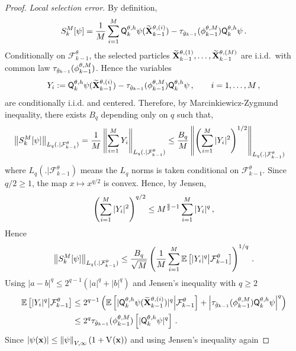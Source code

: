 \documentclass[11pt]{article}
\theoremstyle{plain}
\theoremstyle{definition}
\theoremstyle{remark}
\begin{document}
\begin{proof}
\noindent\emph{Local selection error.} By definition,
        $$
        \selerr{k}[\psi]
        = \frac1M \sum_{i=1}^M \mk{k}[\theta,h] \psi (\widetilde \X^{\theta,(i)}_{k-1}) - \tau_{\approxpot{k-1}}(\mcfilter{k-1}) \mk{k}[\theta,h]{\psi} \eqsp.
        $$
        Conditionally on $\mathcal F^\theta_{k-1}$, the selected particles $ \widetilde {\mathbf{X}}^{\theta,(1)}_{k-1},\ldots,\widetilde {\mathbf{X}}^{\theta ,(M)}_{k-1} $
        are i.i.d.\ with common law $\tau_{\approxpot{k-1}}(\mcfilter{k-1})$. Hence the variables
        $$
        Y_i
        \eqdef \mk{k}[\theta,h]\psi(\widetilde \X^{\theta,(i)}_{k-1})
        - \tau_{\approxpot{k-1}}(\mcfilter{k-1})\mk{k}[\theta,h]{\psi} \eqsp ,
        \qquad i=1,\ldots,M \eqsp,
        $$
        are conditionally i.i.d. and centered. Therefore, by
        Marcinkiewicz-Zygmund inequality, there exists $B_q$ depending only on $q$ such that,
        \begin{align*}
        \normEc{\selerr{k}[\psi] }_{L_q (.|\mathcal F^\theta_{k-1})}
        &= \frac1M \normEc{  \sum_{i=1}^M Y_i }_{L_q (.|\mathcal F_{k-1}^\theta)} \le \frac{B_q}{M} \normEc{ \left(\sum_{i=1}^M |Y_i|^2\right)^{1/2} }_{L_q (.|\mathcal F^\theta_{k-1})}
        \end{align*}
        where $L_q (.|\mathcal F^\theta_{k-1})$ means the $L_q$ norms is taken conditional on $\mathcal F^\theta_{k-1}$. Since $q/2\ge 1$, the map $x\mapsto x^{q/2}$ is convex. Hence, by Jensen,
        $$
        \left( \sum_{i=1}^M |Y_i|^2 \right)^{q/2} \le M^{\frac q2-1} \sum_{i=1}^M |Y_i|^q \,,
        $$
        Hence
        $$
        \normEc{ \selerr{k}[\psi] }_{L_q (.|\mathcal F^\theta_{k-1})} \le \frac{B_q}{\sqrt M} \left( \frac1M \sum_{i=1}^M \E \left[ |Y_i|^q\middle|\mathcal F^\theta_{k-1} \right] \right)^{1/q} \eqsp.
        $$
        Using $|a-b|^q\le 2^{q-1}(|a|^q+|b|^q)$ and Jensen's inequality with $q\ge 2$
        \begin{align*}
        \E \left[ |Y_i|^q \middle| \mathcal{F}^\theta_{k-1} \right]
        & \leq 2^{q-1} \left( \E \left[ | \mk{k}[\theta,h] \psi ( \widetilde \X^{\theta,(i)}_{k-1} ) |^q \middle|
        \mathcal F^\theta_{k-1} \right] + \left| \tau_{\approxpot{k-1}}( \mcfilter{k-1}) \mk{k}[\theta,h]{\psi} \right|^q \right) \\
        & \leq 2^q \tau_{\approxpot{k-1}}(\mcfilter{k-1})
        \left[ |\mk{k}[\theta,h]\psi|^q \right] \eqsp.
        \end{align*}
        Since $|\psi(\x)|\le \normEc{\psi}_{V,\infty}(1+\lyapunov{} (\x))$ and using Jensen's inequality again

\end{proof}
\end{document}
